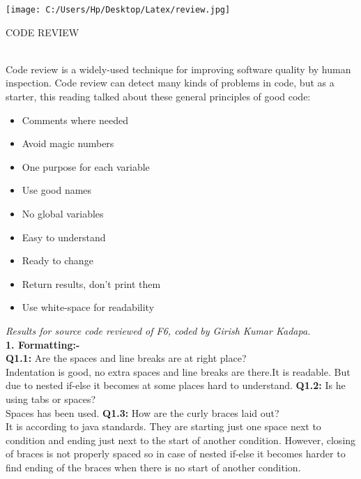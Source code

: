 \documentclass[10pt]{article}
\begin{document}
\noindent\begin{minipage}{0.3\textwidth}%
	\texttt{[image: C:/Users/Hp/Desktop/Latex/review.jpg]}
\end{minipage}%
\hfill%
\begin{minipage}{0.6\textwidth}\raggedleft
	CODE REVIEW \\
\end{minipage}
\\
\newline
\newline
Code review is a widely-used technique for improving software quality by human inspection. Code review can detect many kinds of problems in code, but as a starter, this reading talked about these general principles of good code:
\begin{itemize}
	\item Comments where needed
	\item Avoid magic numbers
	\item One purpose for each variable
	\item Use good names
	\item No global variables
	\item Easy to understand
	\item Ready to change
	\item Return results, don’t print them
	\item Use white-space for readability
\end{itemize}
\newpage
 \textit{Results for source code reviewed of F6, coded by Girish Kumar Kadapa.}\\
\newline
 \textbf{1. Formatting:-} \\
\textbf{ Q1.1:} Are the spaces and line breaks are at right place? \\
 Indentation is good, no extra spaces and line breaks are there.It is readable. But due to nested if-else it becomes at some places hard to understand.
 \newline
\textbf{Q1.2:} Is he using tabs or spaces? \\
Spaces has been used.
\newline
\textbf{Q1.3:} How are the curly braces laid out?\\
 It is according to java standards. They are starting just one space next to condition and ending just next to the start of another condition. However, closing of braces is not properly spaced so in case of nested if-else it becomes harder to find ending of the braces when there is no start of another condition. \\
\end{document}
